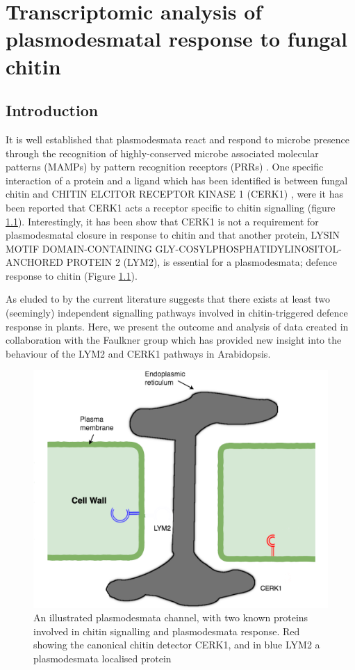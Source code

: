 \documentclass[../main.tex]{subfiles}
\begin{document}
\chapter{Transcriptomic analysis of plasmodesmatal response to fungal chitin}
\label{cha:transcripts}

\section{Introduction}
It is well established that plasmodesmata react and respond to microbe presence
through the recognition of highly-conserved microbe associated molecular
patterns (MAMPs) by pattern recognition receptors (PRRs)
\cite{zipfelPlantPatternrecognitionReceptors2014a,
  chevalPlasmodesmalRegulationPlant2018}. One specific interaction of a protein
and a ligand which has been identified is between fungal chitin and CHITIN
ELCITOR RECEPTOR KINASE 1 (CERK1) \cite{miyaCERK1LysMReceptor2007}, were it has
been reported that CERK1 acts a receptor specific to chitin signalling (figure
\ref{fig:receptors}). Interestingly, it has been show that CERK1 is not a
requirement for plasmodesmatal closure in response to chitin and that another
protein, LYSIN MOTIF DOMAIN-CONTAINING GLY-COSYLPHOSPHATIDYLINOSITOL-ANCHORED
PROTEIN 2 (LYM2), is essential for a plasmodesmata; defence response to chitin
\cite{Faulkner2013} (Figure \ref{fig:receptors}).

As eluded to by \citet{Faulkner2013} the current literature suggests that there
exists at least two (seemingly) independent signalling pathways involved in
chitin-triggered defence response in plants. Here, we present the outcome and
analysis of data created in collaboration with the Faulkner group which has
provided new insight into the behaviour of the LYM2 and CERK1 pathways in
Arabidopsis.


\begin{figure}[ht]
  \centering
  \includegraphics[width=0.5\columnwidth]{figures/original desmotubule.png}
  \caption{\label{fig:receptors}An illustrated plasmodesmata channel, with two
    known proteins involved in chitin signalling and plasmodesmata response. Red
  showing the canonical chitin detector CERK1, and in blue LYM2 a plasmodesmata
  localised protein}
\end{figure}
\end{document}
